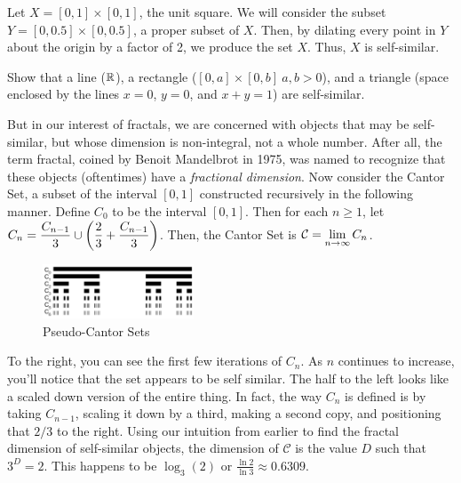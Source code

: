 \begin{example}
    Let $X=[0,1]\times[0,1]$, the unit square. We will consider the subset $Y=[0,0.5]\times[0,0.5]$, a proper subset of $X$. Then, by dilating every point in $Y$ about the origin by a factor of 2, we produce the set $X$. Thus, $X$ is self-similar.
\end{example}

\begin{exercise}
    Show that a line ($\mathbb{R}$), a rectangle ($[0,a]\times[0,b] \ a,b>0$), and a triangle (space enclosed by the lines $x=0$, $y=0$, and $x+y=1$)  are self-similar.
\end{exercise}

But in our interest of fractals, we are concerned with objects that may be self-similar, but whose dimension is non-integral, not a whole number. After all, the term fractal, coined by Benoit Mandelbrot in 1975, was named to recognize that these objects (oftentimes) have a \emph{fractional dimension}. Now consider the Cantor Set, a subset of the interval $[0,1]$ constructed recursively in the following manner. Define $C_0$ to be the interval $[0,1]$. Then for each $n\geq 1$, let $\displaystyle C_n = \frac{C_{n-1}}{3}\cup \left(\frac{2}{3} + \frac{C_{n-1}}{3}\right)$. Then, the Cantor Set is $\displaystyle \mathcal{C}=\lim_{n\to\infty} C_n$. \\

\begin{figure}
  \begin{center}
    \includegraphics[width=0.4\textwidth]{Images/1.4.3.png}
  \end{center}
  \caption{Pseudo-Cantor Sets}
\end{figure}

To the right, you can see the first few iterations of $C_n$. As $n$ continues to increase, you'll notice that the set appears to be self similar. The half to the left looks like a scaled down version of the entire thing. In fact, the way $C_n$ is defined is by taking $C_{n-1}$, scaling it down by a third, making a second copy, and positioning that $2/3$ to the right. Using our intuition from earlier to find the fractal dimension of self-similar objects, the dimension of $\mathcal{C}$ is the value $D$ such that $3^D = 2$. This happens to be $\log_3(2)$ or $ \frac{\ln 2}{\ln 3} \approx 0.6309$. \\


